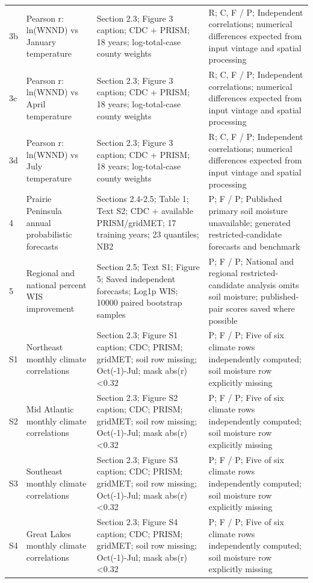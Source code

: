 \documentclass[11pt]{article}
\begin{document}
\begin{longtable}{p{}p{}p{}p{}}
3b & Pearson r: ln(WNND) vs January temperature & Section 2.3; Figure 3 caption; CDC + PRISM; 18 years; log-total-case county weights & R; C, F / P; Independent correlations; numerical differences expected from input vintage and spatial processing \\
3c & Pearson r: ln(WNND) vs April temperature & Section 2.3; Figure 3 caption; CDC + PRISM; 18 years; log-total-case county weights & R; C, F / P; Independent correlations; numerical differences expected from input vintage and spatial processing \\
3d & Pearson r: ln(WNND) vs July temperature & Section 2.3; Figure 3 caption; CDC + PRISM; 18 years; log-total-case county weights & R; C, F / P; Independent correlations; numerical differences expected from input vintage and spatial processing \\
4 & Prairie Peninsula annual probabilistic forecasts & Sections 2.4-2.5; Table 1; Text S2; CDC + available PRISM/gridMET; 17 training years; 23 quantiles; NB2 & P; F / P; Published primary soil moisture unavailable; generated restricted-candidate forecasts and benchmark \\
5 & Regional and national percent WIS improvement & Section 2.5; Text S1; Figure 5; Saved independent forecasts; Log1p WIS; 10000 paired bootstrap samples & P; F / P; National and regional restricted-candidate analysis omits soil moisture; published-pair scores saved where possible \\
S1 & Northeast monthly climate correlations & Section 2.3; Figure S1 caption; CDC; PRISM; gridMET; soil row missing; Oct(-1)-Jul; mask abs(r)<0.32 & P; F / P; Five of six climate rows independently computed; soil moisture row explicitly missing \\
S2 & Mid Atlantic monthly climate correlations & Section 2.3; Figure S2 caption; CDC; PRISM; gridMET; soil row missing; Oct(-1)-Jul; mask abs(r)<0.32 & P; F / P; Five of six climate rows independently computed; soil moisture row explicitly missing \\
S3 & Southeast monthly climate correlations & Section 2.3; Figure S3 caption; CDC; PRISM; gridMET; soil row missing; Oct(-1)-Jul; mask abs(r)<0.32 & P; F / P; Five of six climate rows independently computed; soil moisture row explicitly missing \\
S4 & Great Lakes monthly climate correlations & Section 2.3; Figure S4 caption; CDC; PRISM; gridMET; soil row missing; Oct(-1)-Jul; mask abs(r)<0.32 & P; F / P; Five of six climate rows independently computed; soil moisture row explicitly missing \\

\end{longtable}
\end{document}
